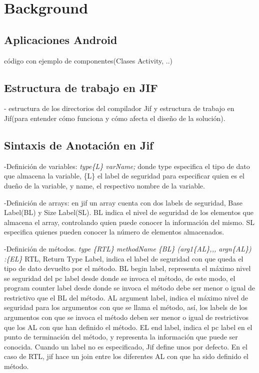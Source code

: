 \section{Background}
\label{sec:back}

\subsection{Aplicaciones Android}
código con ejemplo de componentes(Clases
Activity, ..) 

\subsection{Estructura de trabajo en JIF}
- estructura de los directorios del compilador Jif y estructura de trabajo en
Jif(para entender cómo funciona y cómo afecta el diseño de la
solución).

\subsection{Sintaxis de Anotación en Jif}
\label{subsec:JifSintax}
-Definición de variables: \newline 
\emph{ type\{L\} varName; }\newline 
donde type especifica el tipo de dato que
almacena la variable, \{L\} el label de seguridad  para especificar quien es el
dueño de la variable, y name, el respectivo nombre de la variable.

-Definición de arrays:\newline
en jif un array cuenta con dos labels de seguridad, Base Label(BL) y Size
Label(SL). BL indica el nivel de seguridad de los elementos que almacena el
array, controlando quien puede conocer la información del mismo. SL especifica
quienes pueden conocer la número de elementos almacenados.

-Definición de métodos.\newline
\emph{ type \{RTL\} methodName \{BL\} (arg1\{AL\},,, argn\{AL\}) :\{EL\}
}\newline 
RTL, Return Type Label, indica el label de seguridad con que
queda el tipo de dato devuelto por el método.\newline 
BL begin label, representa el máximo nivel se seguridad del pc label desde donde
se invoca el método, de este modo, el program counter label desde donde
se invoca el método debe ser menor o igual de restrictivo que el BL del
método.\newline 
AL argument label, indica el máximo nivel de seguridad  para los argumentos con
que se llama el método, así, los labels de los argumentos con que se invoca el
método deben ser menor o igual de restrictivos que los AL con que han
definido el método.\newline
EL end label, indica el pc label en el punto de terminación del método, y
representa la información que puede ser conocida.\newline
Cuando un label no es especificado, Jif define unos por defecto. En el caso de
RTL, jif hace un join entre los diferentes AL con que ha sido definido el
método.\newline